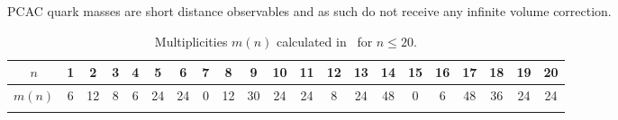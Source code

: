 PCAC quark masses are short distance observables and as such do not receive any infinite volume correction.

\begin{longtable}{c c c c c c c c c c c c c c c c c c c c c}
\toprule
$n$ & 1 & 2 & 3 & 4 & 5 & 6 & 7 & 8 & 9 & 10 & 11 & 12 & 13 & 14 & 15 & 16 & 17 & 18 & 19 & 20 \\
\midrule
$m(n)$ & 6 & 12 & 8 & 6 & 24 & 24 & 0 & 12 & 30 & 24 & 24 & 8 & 24 & 48 & 0 & 6 & 48 & 36 & 24 & 24 \\
\bottomrule
\caption{Multiplicities $m(n)$ calculated in~\cite{} for $n\leq20$.}
\label{apex_fv:tab:mn}
\end{longtable}



